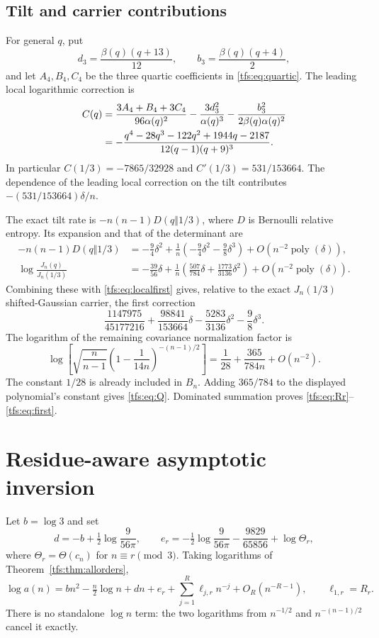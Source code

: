 \documentclass[11pt,a4paper]{article}
\numberwithin{equation}{section}
\theoremstyle{remark}
\newcommand{\1}{\mathbf 1}
\newcommand{\poly}{\operatorname{poly}}
\begin{document}
\subsection{Tilt and carrier contributions}
For general $q$, put
\[
d_3=\frac{\beta(q)(q+13)}{12},\qquad
b_3=\frac{\beta(q)(q+4)}2,
\]
and let $A_4,B_4,C_4$ be the three quartic coefficients in
\eqref{tfs:eq:quartic}. The leading local logarithmic correction is
\begin{align}\label{tfs:eq:Cq}
C(q)&=\frac{3A_4+B_4+3C_4}{96\alpha(q)^2}
       -\frac{3d_3^2}{\alpha(q)^3}
       -\frac{b_3^2}{2\beta(q)\alpha(q)^2}\notag\\
&=-\frac{q^4-28q^3-122q^2+1944q-2187}
                    {12(q-1)(q+9)^3}.
\end{align}
In particular $C(1/3)=-7865/32928$ and $C'(1/3)=531/153664$.
The dependence of the leading local correction on the tilt contributes
$-(531/153664)\delta/n$.

The exact tilt rate is $-n(n-1)D(q\Vert1/3)$, where $D$ is Bernoulli
relative entropy. Its expansion and that of the determinant are
\begin{align}
-n(n-1)D(q\Vert1/3)
 &=-\frac94\delta^2+\frac1n\left(-\frac94\delta^2-\frac98\delta^3\right)
                         +O(n^{-2}\poly(\delta)),\label{tfs:eq:ratefirst}\\
\log\frac{J_n(q)}{J_n(1/3)}
 &=-\frac{39}{56}\delta+
      \frac1n\left(\frac{507}{784}\delta+\frac{1773}{3136}\delta^2\right)
                         +O(n^{-2}\poly(\delta)).\label{tfs:eq:detfirst}
\end{align}
Combining these with \eqref{tfs:eq:localfirst} gives, relative to the exact
$J_n(1/3)$ shifted-Gaussian carrier, the first correction
\[
\frac{1147975}{45177216}
+\frac{98841}{153664}\delta-\frac{5283}{3136}\delta^2-\frac98\delta^3.
\]
The logarithm of the remaining covariance normalization factor is
\[
\log\left[\sqrt{\frac n{n-1}}
             \left(1-\frac1{14n}\right)^{-(n-1)/2}\right]
           =\frac1{28}+\frac{365}{784n}+O(n^{-2}).
\]
The constant $1/28$ is already included in $B_n$.
Adding $365/784$ to the displayed polynomial's constant gives
\eqref{tfs:eq:Q}. Dominated summation proves \eqref{tfs:eq:Rr}--\eqref{tfs:eq:first}.

\section{Residue-aware asymptotic inversion}\label{tfs:sec:inverse}
Let $b=\log3$ and set
\begin{equation}\label{tfs:eq:de}
d=-b+\tfrac12\log\frac9{56\pi},\qquad
e_r=-\tfrac12\log\frac9{56\pi}-\frac{9829}{65856}+\log\Theta_r,
\end{equation}
where $\Theta_r=\Theta(c_n)$ for $n\equiv r\pmod3$.
Taking logarithms of Theorem~\ref{tfs:thm:allorders},
\begin{equation}\label{tfs:eq:logforward}
\log a(n)=bn^2-\tfrac n2\log n+dn+e_r
  +\sum_{j=1}^R\ell_{j,r}n^{-j}+O_R(n^{-R-1}),\qquad
\ell_{1,r}=R_r.
\end{equation}
There is no standalone $\log n$ term: the two logarithms from
$n^{-1/2}$ and $n^{-(n-1)/2}$ cancel it exactly.
\end{document}

